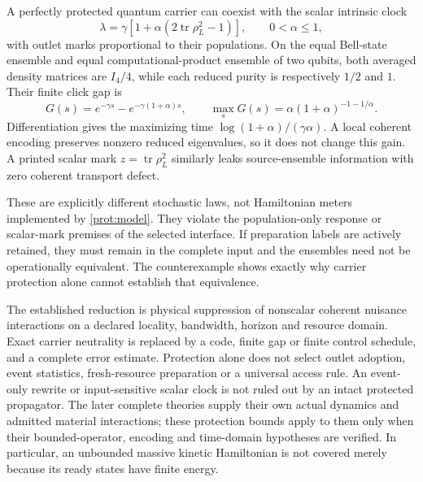 \documentclass[11pt,oneside,openany]{book}
\theoremstyle{definition}
\theoremstyle{remark}\newtheorem{remark}[theorem]{Remark}
\begin{document}
A perfectly protected quantum carrier can coexist with the scalar intrinsic clock
\begin{equation}
 \lambda=\gamma[1+\alpha(2\operatorname{tr}\rho_L^2-1)],
 \qquad0<\alpha\le1,
 \label{prot:purityclock}
\end{equation}
with outlet marks proportional to their populations. On the equal Bell-state ensemble and equal computational-product ensemble of two qubits, both averaged density matrices are $I_4/4$, while each reduced purity is respectively $1/2$ and $1$. Their finite click gap is
\begin{equation}
 G(s)=e^{-\gamma s}-e^{-\gamma(1+\alpha)s},
 \qquad\max_sG(s)=\alpha(1+\alpha)^{-1-1/\alpha}.
 \label{prot:clockgap}
\end{equation}
Differentiation gives the maximizing time $\log(1+\alpha)/(\gamma\alpha)$. A local coherent encoding preserves nonzero reduced eigenvalues, so it does not change this gain. A printed scalar mark $z=\operatorname{tr}\rho_L^2$ similarly leaks source-ensemble information with zero coherent transport defect.

These are explicitly different stochastic laws, not Hamiltonian meters implemented by \eqref{prot:model}. They violate the population-only response or scalar-mark premises of the selected interface. If preparation labels are actively retained, they must remain in the complete input and the ensembles need not be operationally equivalent. The counterexample shows exactly why carrier protection alone cannot establish that equivalence.

The established reduction is physical suppression of nonscalar coherent nuisance interactions on a declared locality, bandwidth, horizon and resource domain. Exact carrier neutrality is replaced by a code, finite gap or finite control schedule, and a complete error estimate. Protection alone does not select outlet adoption, event statistics, fresh-resource preparation or a universal access rule. An event-only rewrite or input-sensitive scalar clock is not ruled out by an intact protected propagator. The later complete theories supply their own actual dynamics and admitted material interactions; these protection bounds apply to them only when their bounded-operator, encoding and time-domain hypotheses are verified. In particular, an unbounded massive kinetic Hamiltonian is not covered merely because its ready states have finite energy.

\end{document}
